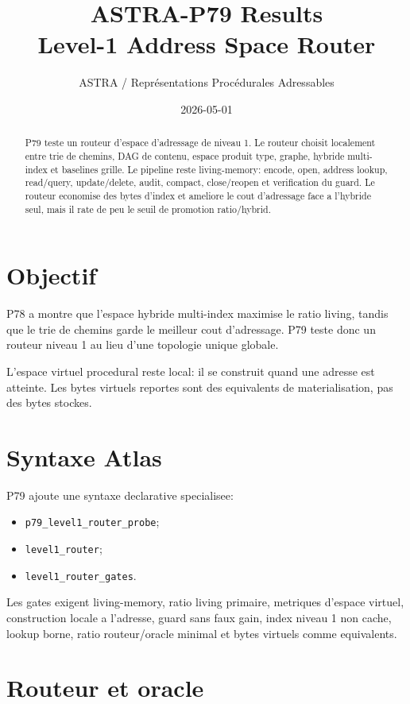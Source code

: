 \documentclass[a4paper,11pt]{article}
\title{\textbf{ASTRA-P79 Results}\\Level-1 Address Space Router}
\author{ASTRA / Repr\'esentations Proc\'edurales Adressables}
\date{2026-05-01}
\begin{document}
\maketitle

\begin{abstract}
P79 teste un routeur d'espace d'adressage de niveau 1. Le routeur choisit
localement entre trie de chemins, DAG de contenu, espace produit type, graphe,
hybride multi-index et baselines grille. Le pipeline reste living-memory:
encode, open, address lookup, read/query, update/delete, audit, compact,
close/reopen et verification du guard. Le routeur economise des bytes d'index
et ameliore le cout d'adressage face a l'hybride seul, mais il rate de peu le
seuil de promotion ratio/hybrid.
\end{abstract}

\section{Objectif}

P78 a montre que l'espace hybride multi-index maximise le ratio living, tandis
que le trie de chemins garde le meilleur cout d'adressage. P79 teste donc un
routeur niveau 1 au lieu d'une topologie unique globale.

L'espace virtuel procedural reste local: il se construit quand une adresse est
atteinte. Les bytes virtuels reportes sont des equivalents de materialisation,
pas des bytes stockes.

\section{Syntaxe Atlas}

P79 ajoute une syntaxe declarative specialisee:

\begin{itemize}
  \item \texttt{p79\_level1\_router\_probe};
  \item \texttt{level1\_router};
  \item \texttt{level1\_router\_gates}.
\end{itemize}

Les gates exigent living-memory, ratio living primaire, metriques d'espace
virtuel, construction locale a l'adresse, guard sans faux gain, index niveau 1
non cache, lookup borne, ratio routeur/oracle minimal et bytes virtuels comme
equivalents.

\section{Routeur et oracle}
\end{document}
